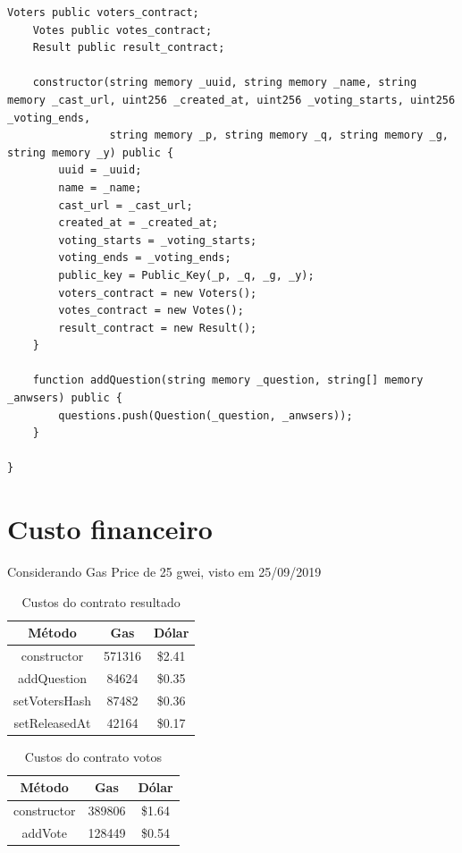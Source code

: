 \documentclass{ufsctex/ufsctex}
\begin{document}
\begin{lstlisting}[language=Solidity]
    Voters public voters_contract;
    Votes public votes_contract;
    Result public result_contract;
    
    constructor(string memory _uuid, string memory _name, string memory _cast_url, uint256 _created_at, uint256 _voting_starts, uint256 _voting_ends,
                string memory _p, string memory _q, string memory _g, string memory _y) public {
        uuid = _uuid;
        name = _name;
        cast_url = _cast_url;
        created_at = _created_at;
        voting_starts = _voting_starts;
        voting_ends = _voting_ends;
        public_key = Public_Key(_p, _q, _g, _y);
        voters_contract = new Voters();
        votes_contract = new Votes();
        result_contract = new Result();
    }
    
    function addQuestion(string memory _question, string[] memory _anwsers) public {
        questions.push(Question(_question, _anwsers));
    }
    
}

\end{lstlisting}

\section{Custo financeiro}

Considerando Gas Price de 25 gwei, visto em 25/09/2019

\begin{table}[]
\centering
\begin{tabular}{||c|c|c||}
\hline
	\textbf{Método}        & \textbf{Gas}    & \textbf{Dólar}  \\  [0.2ex] \hline \hline
constructor   & 571316 & \$2.41 \\
addQuestion   & 84624  & \$0.35 \\ 
setVotersHash & 87482  & \$0.36 \\ 
setReleasedAt & 42164  & \$0.17 \\ \hline
\end{tabular}
\caption{Custos do contrato resultado}
\label{tab:my-table}
\end{table}

\begin{table}[]
\centering
\begin{tabular}{||c|c|c||}
		\hline
		\textbf{Método} & \textbf{Gas} & \textbf{Dólar}  \\ [0.2ex] \hline \hline
		constructor & 389806 & \$1.64 \\ 
		addVote     & 128449 & \$0.54 \\ \hline
	\end{tabular}
	\caption{Custos do contrato votos}
	\label{tab:my-table}
\end{table}
\end{document}
